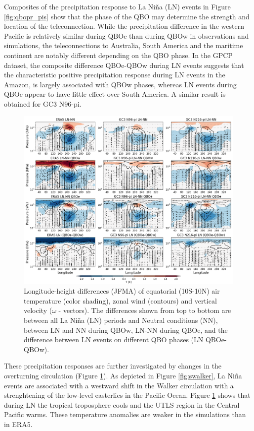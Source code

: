 Composites of the precipitation response to La Niña (LN) events in Figure \ref{fig:qbopr_pis} show that the phase of the QBO may determine the strength and location of the teleconnection. 
While the precipitation difference in the western Pacific is relatively similar during QBOe than during QBOw in observations and simulations, the teleconnections to Australia, South America and the maritime continent are notably different depending on the QBO phase. 
In the GPCP dataset, the composite difference QBOe-QBOw during LN events suggests that the characteristic positive precipitation response during LN events in the Amazon, is largely associated with QBOw phases, whereas LN events during QBOe appear to have little effect over South America. 
A similar result is obtained for GC3 N96-pi. 


\begin{figure}[t!]
\includegraphics[width=\linewidth]{figures/walker_wqbo_jfma}
\caption[Walker circulation responses to La Niña under different QBO phases] {Longitude-height differences (JFMA) of equatorial (10S-10N) air temperature (color shading), zonal wind (contours) and vertical velocity ($\omega$ - vectors). The differences shown from top to bottom are between all La Niña (LN) periods and Neutral conditions (NN), between LN and NN during QBOw, LN-NN during QBOe, and the difference between LN events on different QBO phases (LN QBOe-QBOw). 
}
\label{fig:qbowalker_pis}
\end{figure}

These precipitation responses are further investigated by changes in the overturning circulation (Figure \ref{fig:qbowalker_pis}). As depicted in Figure \ref{fig:swalker}, La Niña events are associated with a westward shift in the Walker circulation with a strenghtening of the low-level easterlies in the Pacific Ocean. 
Figure \ref{fig:qbowalker_pis} shows that during LN the tropical troposphere cools and the UTLS region in the Central Pacific warms. These temperature anomalies are weaker in the simulations than in ERA5. 

